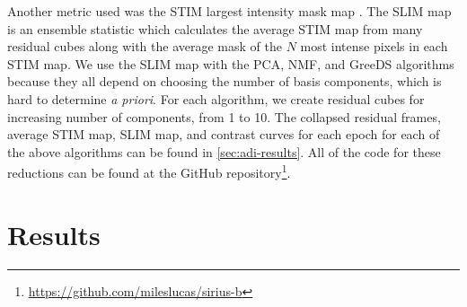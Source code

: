 \documentclass[twocolumn]{aastex631}
\begin{document}
Another metric used was the STIM largest intensity mask map \citep[SLIM map;][]{pairet_signal_2020}. The SLIM map is an ensemble statistic which calculates the average STIM map from many residual cubes along with the average mask of the $N$ most intense pixels in each STIM map. We use the SLIM map with the PCA, NMF, and GreeDS algorithms because they all depend on choosing the number of basis components, which is hard to determine \textit{a priori}. For each algorithm, we create residual cubes for increasing number of components, from 1 to 10. The collapsed residual frames, average STIM map, SLIM map, and contrast curves for each epoch for each of the above algorithms can be found in \autoref{sec:adi-results}. All of the code for these reductions can be found at the GitHub repository\footnote{\href{https://github.com/mileslucas/sirius-b}{https://github.com/mileslucas/sirius-b}}.

\section{Results} \label{sec:results}

\begin{figure*}
    \centering
    \caption{The flat residuals of each epoch after PSF subtraction, derotating, and collapsing. The inner full-width at half-maximum (FWHM) is masked out for each frame.}
    \label{fig:residuals}
\end{figure*}

\begin{figure*}
    \centering
    \caption{The \textit{significance} maps for each epoch accounting for small sample statistics \citep{mawet_fundamental_2014}. Typically a critical value for detection is 5. The inner full-width at half-maximum (FWHM) is masked out for each map.}
    \label{fig:sig}
\end{figure*}

\begin{figure*}
    \centering
    \caption{The STIM maps for each epoch calculated from the residual cube. Note that the STIM probability has a typical cutoff threshold of 0.5 for significant detections. The inner full-width at half-maximum (FWHM) is masked out for each map.}
    \label{fig:stim}
\end{figure*}

\begin{figure*}[t]
    \centering
    \caption{The contrast curves for the best performing algorithm from each epoch. The solid lines are the Gaussian 5$\sigma$ contrast curves and the dashed lines are the Student-t corrected cuves \citep{mawet_fundamental_2014}. In addition, the expected upper limit for orbital separation of a stable orbit \citep{bond_sirius_2017} of \qty{1.5}{\au} are plotted in a vertical dashed line. The companion mass values are interpolated from the AMES-Cond grid \citep{allard_models_2012}. The lower mass limit (upper magnitude limit) of these models is plotted in a light-gray horizontal dashed line.}
    \label{fig:contrast}
\end{figure*}
\end{document}
